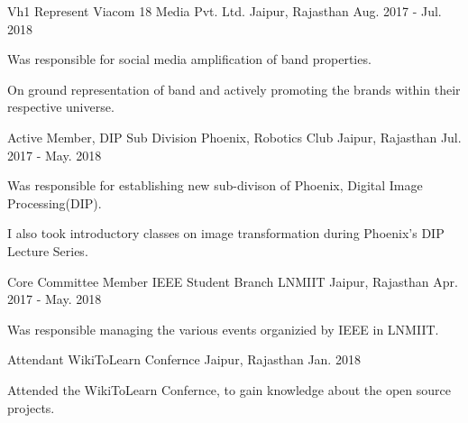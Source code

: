 

\begin{cventries}

  \cventry
    {Vh1 Represent} %
    {Viacom 18 Media Pvt. Ltd.} %
    {Jaipur, Rajasthan} %
    {Aug. 2017 - Jul. 2018} %
    {
      \begin{cvitems} %
        \item {Was responsible for social media amplification of band properties.}
        \item {On ground representation of band and actively promoting the brands within their respective universe.}
      \end{cvitems}
    }

  \cventry
    {Active Member, DIP Sub Division} %
    {Phoenix, Robotics Club} %
    {Jaipur, Rajasthan} %
    {Jul. 2017 - May. 2018} %
    {
      \begin{cvitems} %
        \item {Was responsible for establishing new sub-divison of Phoenix, Digital Image Processing(DIP).}
        \item {I also took introductory classes on image transformation during Phoenix's DIP Lecture Series.}
      \end{cvitems}
    }

  \cventry
    {Core Committee Member} %
    {IEEE Student Branch LNMIIT} %
    {Jaipur, Rajasthan} %
    {Apr. 2017 - May. 2018} %
    {
      \begin{cvitems} %
        \item {Was responsible managing the various events organizied by IEEE in LNMIIT.}
      \end{cvitems}
    }
    
      \cventry
    {Attendant} %
    {WikiToLearn Confernce} %
    {Jaipur, Rajasthan} %
    {Jan. 2018} %
    {
      \begin{cvitems} %
        \item {Attended the WikiToLearn Confernce, to gain knowledge about the open source projects.}
      \end{cvitems}
    }

\end{cventries}
